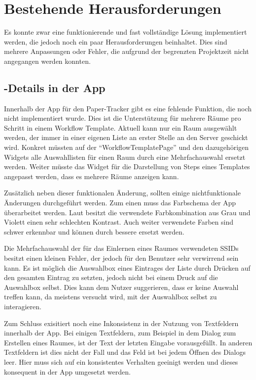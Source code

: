\section{Bestehende Herausforderungen}

Es konnte zwar eine funktionierende und fast vollständige Lösung implementiert werden, die jedoch noch ein paar
Herausforderungen beinhaltet.
Dies sind mehrere Anpassungen oder Fehler, die aufgrund der begrenzten Projektzeit nicht angegangen werden konnten.

\subsection{-Details in der App}

Innerhalb der App für den Paper-Tracker gibt es eine fehlende Funktion, die noch nicht implementiert wurde.
Dies ist die Unterstützung für mehrere Räume pro Schritt in einem Workflow Template.
Aktuell kann nur ein Raum ausgewählt werden, der immer in einer eigenen Liste an erster Stelle an den Server geschickt wird.
Konkret müssten auf der \enquote{WorkflowTemplatePage} und den dazugehörigen Widgets alle Auswahllisten für einen Raum durch
eine Mehrfachauswahl ersetzt werden.
Weiter müsste das Widget für die Darstellung von Steps eines Templates angepasst werden, dass es mehrere Räume anzeigen kann.

Zusätzlich neben dieser funktionalen Änderung, sollten einige nichtfunktionale Änderungen durchgeführt werden.
Zum einen muss das Farbschema der App überarbeitet werden.
Laut  besitzt die verwendete Farbkombination aus Grau und Violett einen sehr schlechten Kontrast.
Auch weiter verwendete Farben sind schwer erkennbar und können durch bessere ersetzt werden.

Die Mehrfachauswahl der für das Einlernen eines Raumes verwendeten \gls{SSID}s besitzt einen kleinen Fehler, der jedoch
für den Benutzer sehr verwirrend sein kann.
Es ist möglich die Auswahlbox eines Eintrages der Liste durch Drücken auf den gesamten Eintrag zu setzten, jedoch nicht
bei einem Druck auf die Auswahlbox selbst.
Dies kann dem Nutzer suggerieren, dass er keine Auswahl treffen kann, da meistens versucht wird, mit der Auswahlbox selbst
zu interagieren.

Zum Schluss exisitiert noch eine Inkonsistenz in der Nutzung von Textfeldern innerhalb der App.
Bei einigen Textfeldern, zum Beispiel in dem Dialog zum Erstellen eines Raumes, ist der Text der letzten Eingabe vorausgefüllt.
In anderen Textfeldern ist dies nicht der Fall und das Feld ist bei jedem Öffnen des Dialogs leer.
Hier muss sich auf ein konsistentes Verhalten geeinigt werden und dieses konsequent in der App umgesetzt werden.

